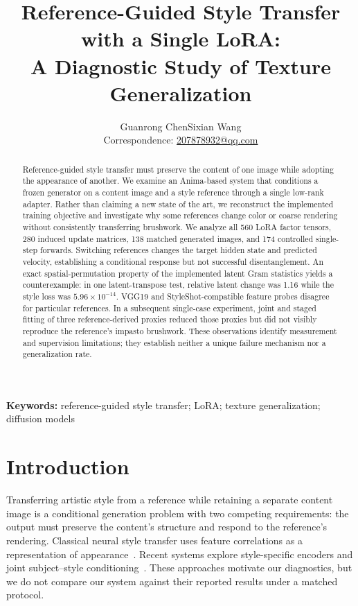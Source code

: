 \documentclass[10pt,letterpaper]{article}
\title{Reference-Guided Style Transfer with a Single LoRA:\\A Diagnostic Study of Texture Generalization}
\author{Guanrong Chen\quad{\authorcjk 陈冠融}\qquad Sixian Wang\quad{\authorcjk 王思贤}\\[0.5em]\small Correspondence: \href{mailto:207878932@qq.com}{207878932@qq.com}}
\date{}
\begin{document}
\maketitle
\thispagestyle{fancy}

\begin{abstract}
Reference-guided style transfer must preserve the content of one image while adopting the appearance of another. We examine an Anima-based system that conditions a frozen generator on a content image and a style reference through a single low-rank adapter. Rather than claiming a new state of the art, we reconstruct the implemented training objective and investigate why some references change color or coarse rendering without consistently transferring brushwork. We analyze all 560 LoRA factor tensors, 280 induced update matrices, 138 matched generated images, and 174 controlled single-step forwards. Switching references changes the target hidden state and predicted velocity, establishing a conditional response but not successful disentanglement. An exact spatial-permutation property of the implemented latent Gram statistics yields a counterexample: in one latent-transpose test, relative latent change was 1.16 while the style loss was $5.96\times10^{-14}$. VGG19 and StyleShot-compatible feature probes disagree for particular references. In a subsequent single-case experiment, joint and staged fitting of three reference-derived proxies reduced those proxies but did not visibly reproduce the reference's impasto brushwork. These observations identify measurement and supervision limitations; they establish neither a unique failure mechanism nor a generalization rate.
\end{abstract}
\begin{center}
\small\textbf{Keywords:} reference-guided style transfer; LoRA; texture generalization; diffusion models
\end{center}
\clearpage

\section{Introduction}
Transferring artistic style from a reference while retaining a separate content image is a conditional generation problem with two competing requirements: the output must preserve the content's structure and respond to the reference's rendering. Classical neural style transfer uses feature correlations as a representation of appearance~\cite{gatys2015}. Recent systems explore style-specific encoders and joint subject--style conditioning~\cite{styleshot2024,uso2025}. These approaches motivate our diagnostics, but we do not compare our system against their reported results under a matched protocol.
\end{document}
